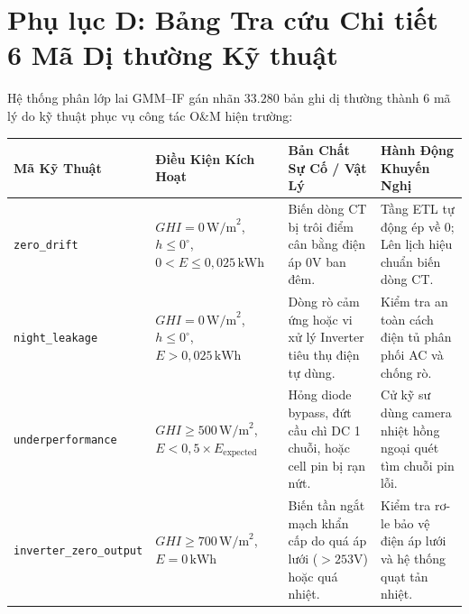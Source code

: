 \documentclass[12pt, a4paper]{report}
\begin{document}
\chapter*{Phụ lục D: Bảng Tra cứu Chi tiết 6 Mã Dị thường Kỹ thuật}
\label{app:outlier_matrix}

Hệ thống phân lớp lai GMM--IF gán nhãn $33.280$ bản ghi dị thường thành 6 mã lý do kỹ thuật phục vụ công tác O\&M hiện trường:

\begin{table}[H]
\centering
\footnotesize
\renewcommand{\arraystretch}{1.35}
\begin{tabularx}{\textwidth}{@{} >{\raggedright\arraybackslash}p{2.6cm} >{\raggedright\arraybackslash}p{3.4cm} >{\raggedright\arraybackslash}X >{\raggedright\arraybackslash}X @{}}
\toprule
\textbf{Mã Kỹ Thuật} & \textbf{Điều Kiện Kích Hoạt} & \textbf{Bản Chất Sự Cố / Vật Lý} & \textbf{Hành Động Khuyến Nghị} \\
\midrule
\texttt{zero\_drift} & $GHI = 0\,\text{W/m}^2$, $h \le 0^\circ$,\newline $0 < E \le 0{,}025\,\text{kWh}$ & Biến dòng CT bị trôi điểm cân bằng điện áp 0V ban đêm. & Tầng ETL tự động ép về $0$; Lên lịch hiệu chuẩn biến dòng CT. \\
\midrule
\texttt{night\_leakage} & $GHI = 0\,\text{W/m}^2$, $h \le 0^\circ$,\newline $E > 0{,}025\,\text{kWh}$ & Dòng rò cảm ứng hoặc vi xử lý Inverter tiêu thụ điện tự dùng. & Kiểm tra an toàn cách điện tủ phân phối AC và chống rò. \\
\midrule
\texttt{underperformance} & $GHI \ge 500\,\text{W/m}^2$,\newline $E < 0{,}5 \times E_{\text{expected}}$ & Hỏng diode bypass, đứt cầu chì DC 1 chuỗi, hoặc cell pin bị rạn nứt. & Cử kỹ sư dùng camera nhiệt hồng ngoại quét tìm chuỗi pin lỗi. \\
\midrule
\texttt{inverter\_zero\_}\newline\texttt{output} & $GHI \ge 700\,\text{W/m}^2$,\newline $E = 0\,\text{kWh}$ & Biến tần ngắt mạch khẩn cấp do quá áp lưới ($>253\text{V}$) hoặc quá nhiệt. & Kiểm tra rơ-le bảo vệ điện áp lưới và hệ thống quạt tản nhiệt. \\

\end{tabularx}
\end{table}
\end{document}
